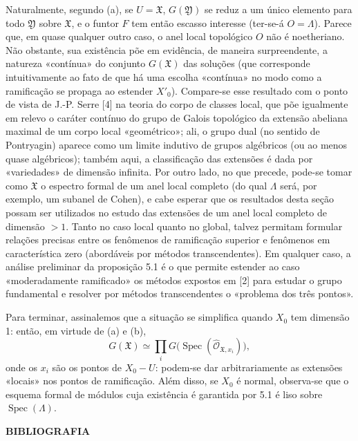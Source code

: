 Naturalmente, segundo (a), se $U=\mathfrak X$, $G(\mathfrak Y)$ se reduz a um
único elemento para todo $\mathfrak Y$ sobre $\mathfrak X$, e o funtor $F$
tem então escasso interesse (ter-se-á $O=\Lambda$). Parece que, em quase
qualquer outro caso, o anel local topológico $O$ não é noetheriano. Não
obstante, sua existência põe em evidência, de maneira surpreendente, a
natureza «contínua» do conjunto $G(\mathfrak X)$ das soluções (que
corresponde intuitivamente ao fato de que há uma escolha «contínua» no
modo como a ramificação se propaga ao estender $X'_0$). Compare-se esse
resultado com o ponto de vista de J.-P. Serre [4] na teoria do corpo de
classes local, que põe igualmente em relevo o caráter contínuo do grupo de
Galois topológico da extensão abeliana maximal de um corpo local
«geométrico»; ali, o grupo dual (no sentido de Pontryagin) aparece como um
limite indutivo de grupos algébricos (ou ao menos quase algébricos); também
aqui, a classificação das extensões é dada por «variedades» de
dimensão infinita. Por outro lado, no que precede, pode-se tomar como
$\mathfrak X$ o espectro formal de um anel local completo (do qual
$\Lambda$ será, por exemplo, um subanel de Cohen), e cabe esperar que os
resultados desta seção possam ser utilizados no estudo das extensões
de um anel local completo de dimensão $>1$. Tanto no caso local quanto no
global, talvez permitam formular relações precisas entre os fenômenos de
ramificação superior e fenômenos em característica zero (abordáveis por
métodos transcendentes). Em qualquer caso, a análise preliminar da
proposição 5.1 é o que permite estender ao caso «moderadamente ramificado»
os métodos expostos em [2] para estudar o grupo fundamental e resolver por
métodos transcendentes o «problema dos três pontos».

Para terminar, assinalemos que a situação se simplifica quando $X_0$ tem dimensão 1: então, em virtude de (a) e (b),
\[
  G(\mathfrak X)\simeq
  \prod_iG\bigl(\operatorname{Spec}(\widehat{\mathcal O}_{\mathfrak X,x_i})\bigr),
\]
onde os $x_i$ são os pontos de $X_0-U$: podem-se dar arbitrariamente as
extensões «locais» nos pontos de ramificação. Além disso, se $X_0$ é normal,
observa-se que o esquema formal de módulos cuja existência é garantida por 5.1 é
liso sobre $\operatorname{Spec}(\Lambda)$.

\begin{center}
  \textbf{BIBLIOGRAFIA}
\end{center}


